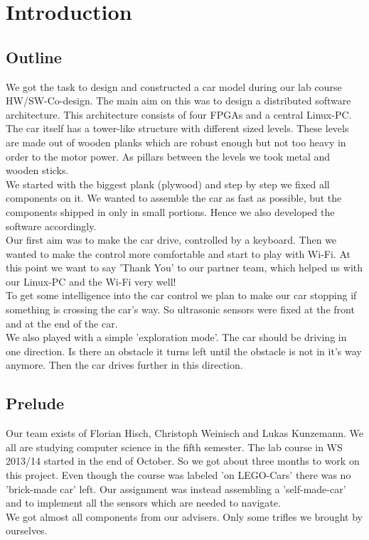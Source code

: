 \section{Introduction}

\subsection{Outline}
We got the task to design and constructed a car model during our lab course HW/SW-Co-design. The main aim on this was to design a distributed software architecture. This architecture consists of four FPGAs and a central Linux-PC.\\

The car itself has a tower-like structure with different sized levels. These levels are made out of wooden planks which are robust enough but not too heavy in order to the motor power. As pillars between the levels we took metal and wooden sticks.\\
We started with the biggest plank (plywood) and step by step we fixed all components on it. We wanted to assemble the car as fast as possible, but the components shipped in only in small portions. Hence we also developed the software accordingly.\\

Our first aim was to make the car drive, controlled by a keyboard. Then we wanted to make the control more comfortable and start to play with Wi-Fi. At this point we want to say 'Thank You' to our partner team, which helped us with our Linux-PC and the Wi-Fi very well!\\

To get some intelligence into the car control we plan to make our car stopping if something is crossing the car's way. So ultrasonic sensors were fixed at the front and at the end of the car.\\

We also played with a simple 'exploration mode'. The car should be driving in one direction. Is there an obstacle it turns left until the obstacle is not in it's way anymore. Then the car drives further in this direction.

\subsection{Prelude}
Our team exists of Florian Hisch, Christoph Weinisch and Lukas Kunzemann. We all are studying computer science in the fifth semester. The lab course in WS 2013/14 started in the end of October. So we got about three months to work on this project. Even though the course was labeled 'on LEGO-Cars' there was no 'brick-made car' left. Our assignment was instead assembling a 'self-made-car' and to implement all the sensors which are needed to navigate.\\

We got almost all components from our advisers. Only some trifles we brought by ourselves.
